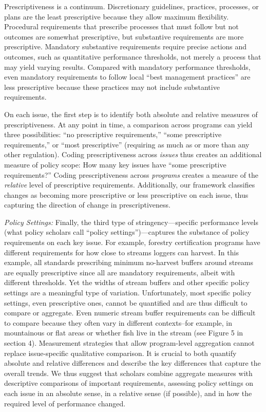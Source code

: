 \documentclass[
      12pt,
            Review ]{article}
\begin{document}
Prescriptiveness is a continuum. Discretionary guidelines, practices, processes, or plans are the least prescriptive because they allow maximum flexibility. Procedural requirements that prescribe processes that must follow but not outcomes are somewhat prescriptive, but substantive requirements are more prescriptive. Mandatory substantive requirements require precise actions and outcomes, such as quantitative performance thresholds, not merely a process that may yield varying results. Compared with mandatory performance thresholds, even mandatory requirements to follow local ``best management practices'' are less prescriptive because these practices may not include substantive requirements.

On each issue, the first step is to identify both absolute and relative measures of prescriptiveness. At any point in time, a comparison across programs can yield three possibilities: ``no prescriptive requirements,'' ``some prescriptive requirements,'' or ``most prescriptive'' (requiring as much as or more than any other regulation). Coding prescriptiveness across \emph{issues} thus creates an additional measure of policy scope: How many key issues have ``some prescriptive requirements?'' Coding prescriptiveness across \emph{programs} creates a measure of the \emph{relative} level of prescriptive requirements. Additionally, our framework classifies changes as becoming more prescriptive or less prescriptive on each issue, thus capturing the direction of change in prescriptiveness.



\emph{Policy Settings:} Finally, the third type of stringency---specific performance levels (what policy scholars call ``policy settings'')---captures the substance of policy requirements on each key issue. For example, forestry certification programs have different requirements for how close to streams loggers can harvest. In this example, all standards prescribing minimum no-harvest buffers around streams are equally prescriptive since all are mandatory requirements, albeit with different thresholds. Yet the widths of stream buffers and other specific policy settings are a meaningful type of variation. Unfortunately, most specific policy settings, even prescriptive ones, cannot be quantified and are thus difficult to compare or aggregate. Even numeric stream buffer requirements can be difficult to compare because they often vary in different contexts--for example, in mountainous or flat areas or whether fish live in the stream (see Figure 5 in section 4). Measurement strategies that allow program-level aggregation cannot replace issue-specific qualitative comparison. It is crucial to both quantify absolute and relative differences and describe the key differences that capture the overall trends. We thus suggest that scholars combine aggregate measures with descriptive comparisons of important requirements, assessing policy settings on each issue in an absolute sense, in a relative sense (if possible), and in how the required level of performance changed.
\end{document}
